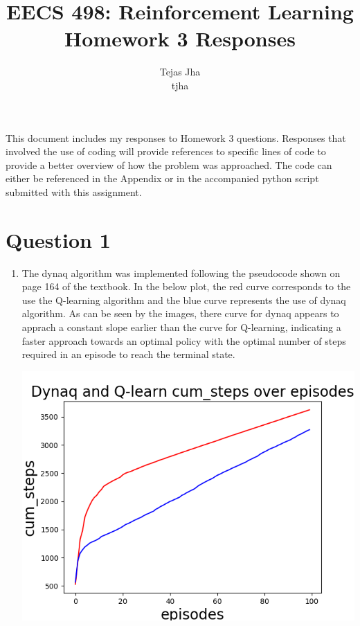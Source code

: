 \documentclass[11pt]{article}
\title{EECS 498: Reinforcement Learning \protect \\ Homework 3 Responses}
\author{Tejas Jha \\ tjha}
\begin{document}
\maketitle
This document includes my responses to Homework 3 questions. Responses that involved the use of coding will provide references to specific lines of code to provide a better overview of how the problem was approached. The code can either be referenced in the Appendix or in the accompanied python script submitted with this assignment.

\section*{Question 1}
\begin{enumerate}[label=(\alph*)]
\item
The dynaq algorithm was implemented following the pseudocode shown on page 164 of the textbook. In the below plot, the red curve corresponds to the use the Q-learning algorithm and the blue curve represents the use of dynaq algorithm. As can be seen by the images, there curve for dynaq appears to apprach a constant slope earlier than the curve for Q-learning, indicating a faster approach towards an optimal policy with the optimal number of steps required in an episode to reach the terminal state.

\includegraphics[scale=1.0]{Figure1.png}


\end{enumerate}
\end{document}
